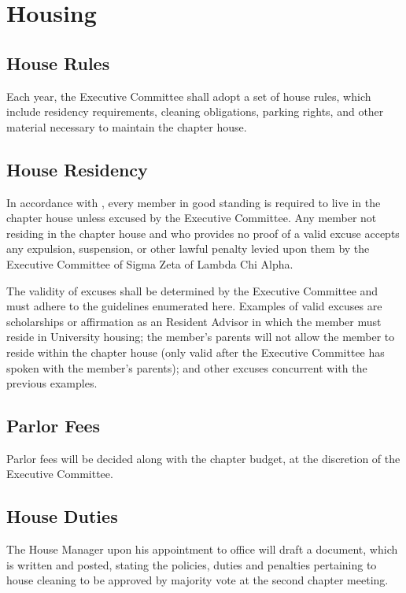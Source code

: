 \documentclass{article}
\begin{document}
\section{Housing}

\subsection{House Rules}

Each year, the Executive Committee shall adopt a set of house rules, which
include residency requirements, cleaning obligations, parking rights, and other
material necessary to maintain the chapter house.

\subsection{House Residency}

In accordance with , every member in good
standing is required to live in the chapter house unless excused by the Executive
Committee. Any member not residing in the chapter house and who provides no
proof of a valid excuse accepts any expulsion, suspension, or other lawful
penalty levied upon them by the Executive Committee of Sigma Zeta of Lambda Chi
Alpha.

The validity of excuses shall be determined by the Executive Committee and must
adhere to the guidelines enumerated here. Examples of valid excuses are
scholarships or affirmation as an Resident Advisor in which the member must
reside in University housing; the member’s parents will not allow the member to
reside within the chapter house (only valid after the Executive Committee has
spoken with the member’s parents); and other excuses concurrent with the
previous examples.

\subsection{Parlor Fees}

Parlor fees will be decided along with the chapter budget, at the discretion of
the Executive Committee.

\subsection{House Duties}

The House Manager upon his appointment to office will draft a document, which is
written and posted, stating the policies, duties and penalties pertaining to
house cleaning to be approved by majority vote at the second chapter meeting.
\end{document}
